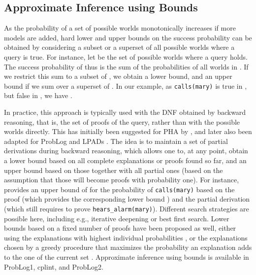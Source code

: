 \documentclass[a4paper]{article}
\begin{document}
\subsection{Approximate Inference using Bounds}\label{sec:bounds}
As the probability of a set of possible worlds monotonically increases if more
models are added, hard lower and upper bounds on the success probability
can be obtained by considering a subset or a superset of all possible
worlds where a query is true. For instance, let  be the set of
possible worlds where a query  holds. The success probability of
 thus is the sum of the probabilities of all worlds in . If we
restrict this sum to a subset of , we obtain a lower bound, and an
upper bound  if
we sum over a superset of . 
In our example, as \verb|calls(mary)| is true in
, but false in  , we have . 

In practice, this approach is typically used with the DNF obtained by
backward reasoning, that is, the set of proofs of the query, rather
than with the possible worlds
directly. This has initially been suggested for PHA by \cite{Poole92},
and later also been adapted for ProbLog
\citep{DeRaedt07-IJCAIa,Kimmig08} and LPADs \citep{bragaglia:ilp11}. The idea is to maintain a set of partial
derivations during backward reasoning, which allows one to, at any
point, obtain a lower bound based on all complete explanations or
proofs found so far, and an upper bound based on those together with
all partial ones (based on the assumption that those will become
proofs with probability one). For instance, 
provides an upper bound of  for the probability of \verb|calls(mary)|
based on the proof  (which provides the corresponding
lower bound ) and the partial derivation  (which
still requires to prove \verb|hears_alarm(mary)|). Different search
strategies are possible here, including e.g., iterative deepening or
best first search. Lower bounds based on a fixed number of proofs
have been proposed as well, either using 
the  explanations with
highest individual probabilities \citep{Kimmig11}, or the 
explanations chosen by a greedy procedure that maximizes the
probability an explanation adds to the one of the current set
\citep{Renkens12}. Approximate inference using bounds is available in
ProbLog1, cplint, and ProbLog2.
\end{document}
